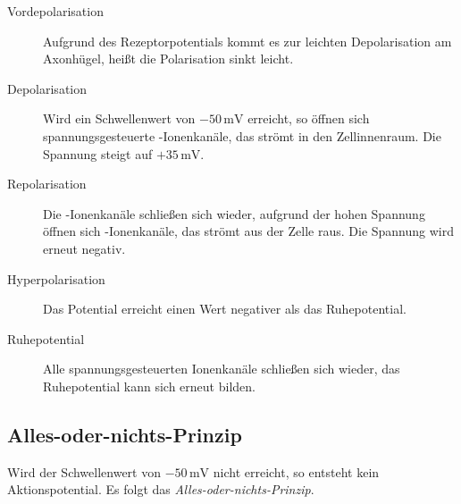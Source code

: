 \documentclass{article}
\begin{document}
\begin{description}
 \item[Vordepolarisation] Aufgrund des Rezeptorpotentials kommt es zur leichten Depolarisation am Axonhügel, heißt die Polarisation sinkt leicht.
 \item[Depolarisation] Wird ein Schwellenwert von $-50\,\text{mV}$ erreicht, so öffnen sich spannungsgesteuerte -Ionenkanäle, das  strömt in den Zellinnenraum. Die Spannung steigt auf $+35\,\text{mV}$.
 \item[Repolarisation] Die -Ionenkanäle schließen sich wieder, aufgrund der hohen Spannung öffnen sich -Ionenkanäle, das  strömt aus der Zelle raus. Die Spannung wird erneut negativ.
 \item[Hyperpolarisation] Das Potential erreicht einen Wert negativer als das Ruhepotential.
 \item[Ruhepotential] Alle spannungsgesteuerten Ionenkanäle schließen sich wieder, das Ruhepotential kann sich erneut bilden. 
\end{description} 
\begin{center}
\end{center} 
 
\subsection{Alles-oder-nichts-Prinzip} 
Wird der Schwellenwert von $-50\,\text{mV}$ nicht erreicht, so entsteht kein Aktionspotential. Es folgt das \emph{Alles-oder-nichts-Prinzip}.
 
\end{document}
